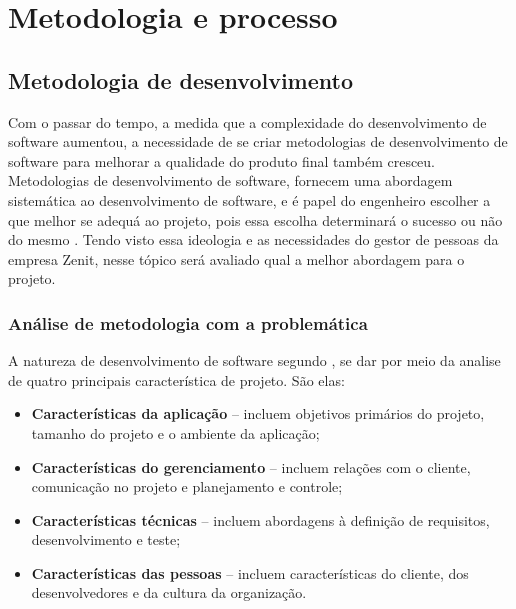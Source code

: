 \chapter[Metodologia e Processo]{Metodologia e processo}
\section{Metodologia de desenvolvimento}
Com o passar do tempo, a medida que a complexidade do desenvolvimento de software aumentou, a necessidade de se criar metodologias de desenvolvimento de software para melhorar a qualidade do produto final também cresceu. Metodologias de desenvolvimento de software, fornecem uma abordagem sistemática ao desenvolvimento de software, e é papel do engenheiro escolher a que melhor se adequá ao projeto, pois essa escolha determinará o sucesso ou não do mesmo \cite{sweebok}. Tendo visto essa ideologia e as necessidades do gestor de pessoas da empresa Zenit, nesse tópico será avaliado qual a melhor abordagem para o projeto.
\subsection{Análise de metodologia com a problemática}
A natureza de desenvolvimento de software segundo \cite{boehm2004}, se dar por meio da analise de quatro principais característica de projeto. São elas:
\begin{itemize}
    \item \textbf{Características da aplicação} – incluem objetivos primários do projeto, tamanho do projeto e o ambiente da aplicação;
    \item \textbf{Características do gerenciamento} – incluem relações com o cliente, comunicação no projeto e planejamento e controle;
    \item \textbf{Características técnicas} – incluem abordagens à definição de requisitos, desenvolvimento e teste;
    \item \textbf{Características das pessoas} – incluem características do cliente, dos desenvolvedores e da cultura da organização.
\end{itemize}
